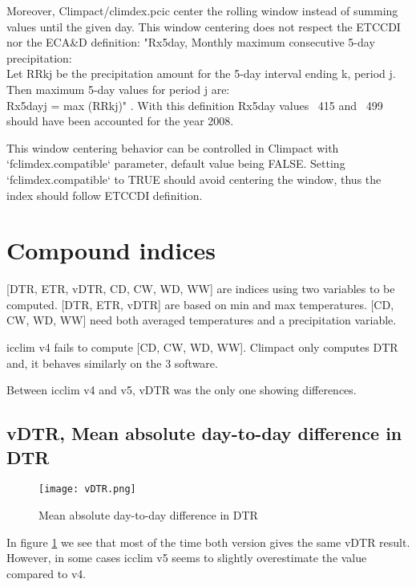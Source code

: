 \documentclass[a4paper,11pt]{article}
\begin{document}
        Moreover, Climpact/climdex.pcic center the rolling window instead of summing values until the given day. 
        This window centering does not respect the ETCCDI nor the ECA\&D definition:
        "Rx5day, Monthly maximum consecutive 5-day precipitation:\\
        Let RRkj be the precipitation amount for the 5-day interval ending k, period j. Then maximum 5-day values for period j are:\\
        Rx5dayj = max (RRkj)" \cite{doc/etccdi}.
        With this definition Rx5day values ~415 and ~499 should have been accounted for the year 2008.

        This window centering behavior can be controlled in Climpact with `fclimdex.compatible` parameter, default value being FALSE.
        Setting `fclimdex.compatible` to TRUE should avoid centering the window, thus the index should follow ETCCDI definition.
        

    \section{Compound indices}
        [DTR, ETR, vDTR, CD, CW, WD, WW] are indices using two variables to be computed.
        [DTR, ETR, vDTR] are based on min and max temperatures.
        [CD, CW, WD, WW] need both averaged temperatures and a precipitation variable.
        
        icclim v4 fails to compute [CD, CW, WD, WW].
        Climpact only computes DTR and, it behaves similarly on the 3 software. 

        Between icclim v4 and v5, vDTR was the only one showing differences.

        \subsection{vDTR, Mean absolute day-to-day difference in DTR}
            \begin{figure}[h]
                \centering
                \texttt{[image: vDTR.png]}
                \caption{Mean absolute day-to-day difference in DTR}
                \label{figure/vdtr}
            \end{figure}
            In figure \ref{figure/vdtr} we see that most of the time both version gives the same vDTR result.
            However, in some cases icclim v5 seems to slightly overestimate the value compared to v4.
\end{document}
